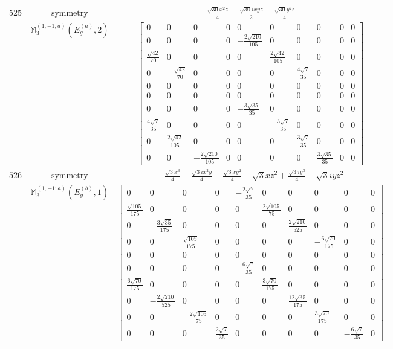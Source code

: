 \documentclass[fleqn,8pt,landscape]{jsarticle}
\begin{document}
\begin{longtable}{ccc}
$ 525 $ & $ \text{symmetry} $ & $ \frac{\sqrt{30} x^{2} z}{4} - \frac{\sqrt{30} i x y z}{2} - \frac{\sqrt{30} y^{2} z}{4} $ \\
$  $ & $ \mathbb{M}_{3}^{(1,-1;a)}(E_{g}^{(a)},2) $ & $ \begin{bmatrix} 0 & 0 & 0 & 0 & 0 & 0 & 0 & 0 & 0 & 0 \\ 0 & 0 & 0 & 0 & - \frac{2 \sqrt{210}}{105} & 0 & 0 & 0 & 0 & 0 \\ \frac{\sqrt{42}}{70} & 0 & 0 & 0 & 0 & \frac{2 \sqrt{42}}{105} & 0 & 0 & 0 & 0 \\ 0 & - \frac{\sqrt{42}}{70} & 0 & 0 & 0 & 0 & \frac{4 \sqrt{7}}{35} & 0 & 0 & 0 \\ 0 & 0 & 0 & 0 & 0 & 0 & 0 & 0 & 0 & 0 \\ 0 & 0 & 0 & 0 & 0 & 0 & 0 & 0 & 0 & 0 \\ 0 & 0 & 0 & 0 & - \frac{3 \sqrt{35}}{35} & 0 & 0 & 0 & 0 & 0 \\ \frac{4 \sqrt{7}}{35} & 0 & 0 & 0 & 0 & - \frac{3 \sqrt{7}}{35} & 0 & 0 & 0 & 0 \\ 0 & \frac{2 \sqrt{42}}{105} & 0 & 0 & 0 & 0 & \frac{3 \sqrt{7}}{35} & 0 & 0 & 0 \\ 0 & 0 & - \frac{2 \sqrt{210}}{105} & 0 & 0 & 0 & 0 & \frac{3 \sqrt{35}}{35} & 0 & 0 \end{bmatrix} $ \\ \hline
$ 526 $ & $ \text{symmetry} $ & $ - \frac{\sqrt{3} x^{3}}{4} + \frac{\sqrt{3} i x^{2} y}{4} - \frac{\sqrt{3} x y^{2}}{4} + \sqrt{3} x z^{2} + \frac{\sqrt{3} i y^{3}}{4} - \sqrt{3} i y z^{2} $ \\
$  $ & $ \mathbb{M}_{3}^{(1,-1;a)}(E_{g}^{(b)},1) $ & $ \begin{bmatrix} 0 & 0 & 0 & 0 & - \frac{2 \sqrt{7}}{35} & 0 & 0 & 0 & 0 & 0 \\ \frac{\sqrt{105}}{175} & 0 & 0 & 0 & 0 & \frac{2 \sqrt{105}}{75} & 0 & 0 & 0 & 0 \\ 0 & - \frac{3 \sqrt{35}}{175} & 0 & 0 & 0 & 0 & \frac{2 \sqrt{210}}{525} & 0 & 0 & 0 \\ 0 & 0 & \frac{\sqrt{105}}{175} & 0 & 0 & 0 & 0 & - \frac{6 \sqrt{70}}{175} & 0 & 0 \\ 0 & 0 & 0 & 0 & 0 & 0 & 0 & 0 & 0 & 0 \\ 0 & 0 & 0 & 0 & - \frac{6 \sqrt{7}}{35} & 0 & 0 & 0 & 0 & 0 \\ \frac{6 \sqrt{70}}{175} & 0 & 0 & 0 & 0 & \frac{3 \sqrt{70}}{175} & 0 & 0 & 0 & 0 \\ 0 & - \frac{2 \sqrt{210}}{525} & 0 & 0 & 0 & 0 & \frac{12 \sqrt{35}}{175} & 0 & 0 & 0 \\ 0 & 0 & - \frac{2 \sqrt{105}}{75} & 0 & 0 & 0 & 0 & \frac{3 \sqrt{70}}{175} & 0 & 0 \\ 0 & 0 & 0 & \frac{2 \sqrt{7}}{35} & 0 & 0 & 0 & 0 & - \frac{6 \sqrt{7}}{35} & 0 \end{bmatrix} $ \\ \hline

\end{longtable}
\end{document}
